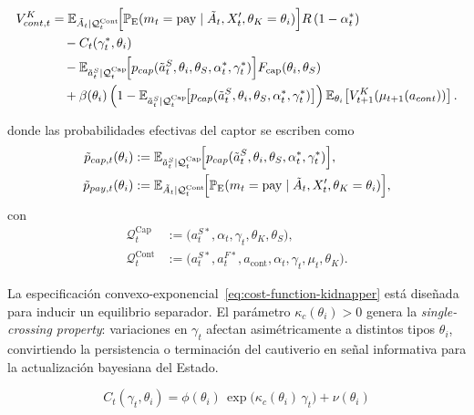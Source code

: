 \documentclass[12pt]{article}
\theoremstyle{definition}
\theoremstyle{remark}
\newcommand{\E}{\mathbb{E}}
\newcommand{\ProbE}{\mathbb{P}_{\mathrm{E}}}
\newcommand{\1}{\mathbf{1}}
\begin{document}
\begin{equation}
  \label{eq:kidnapper-cont}
  \begin{aligned}
  V^K_{cont,t}
  &=
    \E_{\tilde A_t\mid \mathcal Q_t^{\mathrm{Cont}}}\!\Bigl[
      \ProbE(m_t=\mathrm{pay}\mid \tilde A_t,X_t',\theta_K=\theta_i)
    \Bigr] R\, (1 - \alpha_t^\ast) \\
  &\quad - C_t(\gamma_t^\ast, \theta_i) \\
  &\quad - \E_{\tilde a_t^S\mid \mathcal Q_t^{\mathrm{Cap}}}\!\Bigl[
      p_{cap}(\tilde a_t^S,\theta_i,\theta_S,\alpha_t^\ast,\gamma_t^\ast)
    \Bigr] F_{\mathrm{cap}}(\theta_i,\theta_S) \\
  &\quad +
    \beta(\theta_i)\,\Bigl(1-\E_{\tilde a_t^S\mid \mathcal Q_t^{\mathrm{Cap}}}\!\bigl[
      p_{cap}(\tilde a_t^S,\theta_i,\theta_S,\alpha_t^\ast,\gamma_t^\ast)
    \bigr]\Bigr)\,
    \E_{\theta_i}\!\left[
      V^K_{t+1}\!\left(\mu_{t+1}(a_{cont})\right)
    \right].
  \end{aligned}
\end{equation}

\noindent donde las probabilidades efectivas del captor se escriben como
\begin{align}
\tilde{p}_{cap,t}(\theta_i)
&:= \E_{\tilde a_t^S\mid \mathcal Q_t^{\mathrm{Cap}}}\!\Bigl[
    p_{cap}(\tilde a_t^S,\theta_i,\theta_S,\alpha_t^\ast,\gamma_t^\ast)
  \Bigr], \\
\tilde{p}_{pay,t}(\theta_i)
&:= \E_{\tilde A_t\mid \mathcal Q_t^{\mathrm{Cont}}}\!\Bigl[
    \ProbE(m_t=\mathrm{pay}\mid \tilde A_t,X_t',\theta_K=\theta_i)
  \Bigr],
\end{align}
con
\[
\begin{aligned}
\mathcal Q_t^{\mathrm{Cap}}
&:=
\bigl(a_t^{S\ast},\alpha_t,\gamma_t,\theta_K,\theta_S\bigr), \\
\mathcal Q_t^{\mathrm{Cont}}
&:=
\bigl(a_t^{S\ast},a_t^{F\ast},a_{\mathrm{cont}},\alpha_t,\gamma_t,\mu_t,\theta_K\bigr).
\end{aligned}
\]

  La especificación convexo-exponencial~\eqref{eq:cost-function-kidnapper} está diseñada para inducir un equilibrio separador. El parámetro $\kappa_c(\theta_i)>0$ genera la \textit{single-crossing property}: variaciones en $\gamma_t$ afectan asimétricamente a distintos tipos $\theta_i$, convirtiendo la persistencia o terminación del cautiverio en señal informativa para la actualización bayesiana del Estado.

  \begin{equation}
    \label{eq:cost-function-kidnapper}
    C_t(\gamma_t, \theta_i) = \phi(\theta_i)\,\exp\bigl( \kappa_c(\theta_i)\,\gamma_t \bigr) + \nu(\theta_i)
    \end{equation}
    
\end{document}
